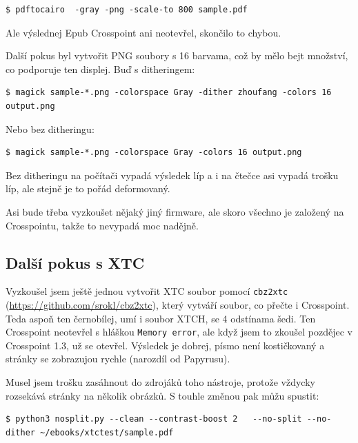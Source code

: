 \documentclass{article}
\begin{document}
\begin{lstlisting}
$ pdftocairo  -gray -png -scale-to 800 sample.pdf
\end{lstlisting}

Ale výslednej Epub Crosspoint ani neotevřel, skončilo to chybou. 

Další pokus byl vytvořit PNG soubory s 16 barvama, což by mělo bejt množství, co podporuje ten displej. Buď s ditheringem:

\begin{lstlisting}
$ magick sample-*.png -colorspace Gray -dither zhoufang -colors 16 output.png
\end{lstlisting}

Nebo bez ditheringu:

\begin{lstlisting}
$ magick sample-*.png -colorspace Gray -colors 16 output.png
\end{lstlisting}

Bez ditheringu na počítači vypadá výsledek líp a i na čtečce asi vypadá trošku líp, ale stejně je to pořád deformovaný. 

Asi bude třeba vyzkoušet nějaký jiný firmware, ale skoro všechno je založený na Crosspointu, takže to nevypadá moc nadějně.




\subsection{Další pokus s XTC}

Vyzkoušel jsem ještě jednou vytvořit XTC soubor pomocí \texttt{cbz2xtc} (\protect\url{https://github.com/srokl/cbz2xtc}), 
který vytváří soubor, co přečte i Crosspoint. Teda aspoň ten černobílej, umí i soubor XTCH, se 4 odstínama šedi. 
Ten Crosspoint neotevřel s hláškou \texttt{Memory error}, ale když jsem to zkoušel pozdějec v Crosspoint 1.3, už se otevřel. 
Výsledek je dobrej, písmo není kostičkovaný a stránky se zobrazujou rychle (narozdíl od Papyrusu).

Musel jsem trošku zasáhnout do zdrojáků toho nástroje, protože vždycky rozsekává stránky na několik obrázků. S touhle změnou 
pak můžu spustit: 

\begin{lstlisting}
$ python3 nosplit.py --clean --contrast-boost 2   --no-split --no-dither ~/ebooks/xtctest/sample.pdf
\end{lstlisting}
\end{document}
